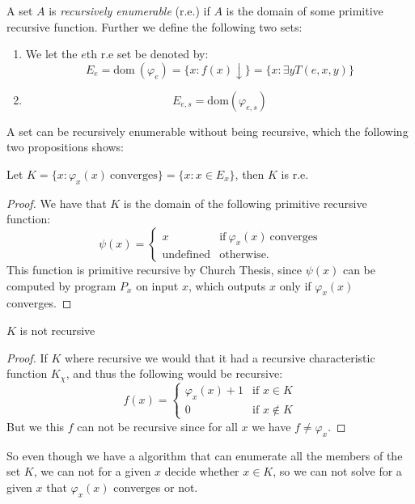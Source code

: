 \documentclass[../main.tex]{subfiles}
\begin{document}
\begin{defi}
	A set $A$ is \textit{recursively enumerable} (r.e.) if $A$ is the domain of some
	primitive recursive function. Further we define the following two sets:
	\begin{enumerate}
		\item We let the $e$th r.e set be denoted by:
			$$E_e=\text{dom}\ (\varphi_e)= \{x:f(x)\downarrow\}=\{x:\exists
			y T(e,x,y)\}$$
		\item \[E_{e,s}=\text{dom} (\varphi_{e,s})\]
	\end{enumerate}
\end{defi}
A set can be recursively enumerable without being recursive, which the
following two propositions shows:
\begin{prop}
	Let $K=\{x:\varphi_x(x)\ \text{converges}\}=\{x:x\in E_x\}$, then $K$
	is r.e.
\end{prop}
\begin{proof}
	We have that $K$ is the domain of the following primitive recursive
	function:
	\[\psi(x)=\begin{cases}
		x &\text{if}\ \varphi_x(x)\ \text{converges}\\
		\text{undefined} &\text{otherwise.}
	\end{cases}\]
	This function is primitive recursive by Church Thesis, since $\psi(x)$
	can be computed by program $P_x$ on input $x$, which outputs $x$ only
	if $\varphi_x(x)$ converges.
\end{proof}
\begin{prop}
	$K$ is not recursive
\end{prop}
\begin{proof}
	If $K$ where recursive we would that it had a recursive characteristic
	function $K_\chi$, and thus the following would be recursive:
	\[f(x)=\begin{cases}
		\varphi_x(x)+1 & \text{if } x\in K\\
		0 & \text{if } x\not \in K
	\end{cases}\]
	But we this $f$ can not be recursive since for all $x$ we have $f\not
	=\varphi_x$.
\end{proof}

So even though we have a algorithm that can enumerate all the members of the
set $K$, we can not for a given $x$ decide whether $x\in K$, so we can not
solve for a given $x$ that $\varphi_x(x)$ converges or not.
\end{document}
